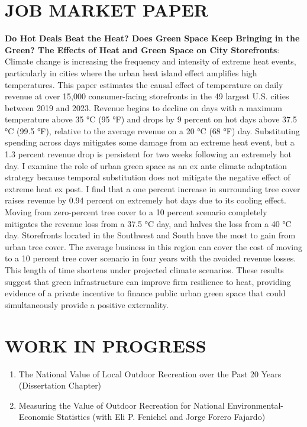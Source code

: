 \documentclass[11pt]{article}
\begin{document}
\section*{JOB MARKET PAPER}
\textbf{Do Hot Deals Beat the Heat? Does Green Space Keep Bringing in the Green? The Effects of Heat and Green Space on City Storefronts}: Climate change is increasing the frequency and intensity of extreme heat events, particularly in cities where the urban heat island effect amplifies high temperatures. This paper estimates the causal effect of temperature on daily revenue at over 15,000 consumer-facing storefronts in the 49 largest U.S. cities between 2019 and 2023. Revenue begins to decline on days with a maximum temperature above 35 °C (95 °F) and drops by 9 percent on hot days above 37.5 °C (99.5 °F), relative to the average revenue on a 20 °C (68 °F) day. Substituting spending across days mitigates some damage from an extreme heat event, but a 1.3 percent revenue drop is persistent for two weeks following an extremely hot day. I examine the role of urban green space as an ex ante climate adaptation strategy because temporal substitution does not mitigate the negative effect of extreme heat ex post. I find that a one percent increase in surrounding tree cover raises revenue by 0.94 percent on extremely hot days due to its cooling effect. Moving from zero-percent tree cover to a 10 percent scenario completely mitigates the revenue loss from a 37.5 °C day, and halves the loss from a 40 °C day. Storefronts located in the Southwest and South have the most to gain from urban tree cover. The average business in this region can cover the cost of moving to a 10 percent tree cover scenario in four years with the avoided revenue losses. This length of time shortens under projected climate scenarios. These results suggest that green infrastructure can improve firm resilience to heat, providing evidence of a private incentive to finance public urban green space that could simultaneously provide a positive externality. 

\section*{WORK IN PROGRESS}
\begin{enumerate}[left=0pt]
    \item The National Value of Local Outdoor Recreation over the Past 20 Years (Dissertation Chapter)
    \item Measuring the Value of Outdoor Recreation for National Environmental-Economic Statistics (with Eli P. Fenichel and Jorge Forero Fajardo)
\end{enumerate}
\end{document}
